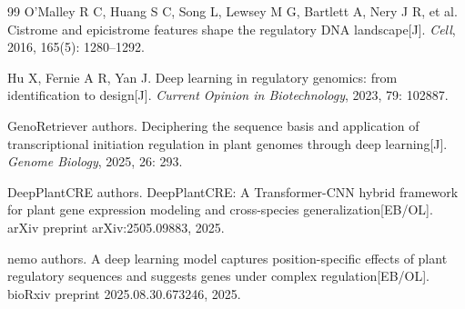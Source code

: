\documentclass[UTF8,11pt,a4paper]{ctexart}
\begin{document}
\begin{thebibliography}{99}
O'Malley R C, Huang S C, Song L, Lewsey M G, Bartlett A, Nery J R, et al.
Cistrome and epicistrome features shape the regulatory DNA landscape[J].
\emph{Cell}, 2016, 165(5): 1280--1292.

Hu X, Fernie A R, Yan J.
Deep learning in regulatory genomics: from identification to design[J].
\emph{Current Opinion in Biotechnology}, 2023, 79: 102887.

GenoRetriever authors.
Deciphering the sequence basis and application of transcriptional initiation regulation in plant genomes through deep learning[J].
\emph{Genome Biology}, 2025, 26: 293.

DeepPlantCRE authors.
DeepPlantCRE: A Transformer-CNN hybrid framework for plant gene expression modeling and cross-species generalization[EB/OL].
arXiv preprint arXiv:2505.09883, 2025.

nemo authors.
A deep learning model captures position-specific effects of plant regulatory sequences and suggests genes under complex regulation[EB/OL].
bioRxiv preprint 2025.08.30.673246, 2025.

\end{thebibliography}
\end{document}
